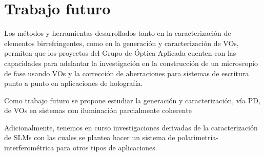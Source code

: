 
\section{Trabajo futuro}

Los métodos y herramientas desarrollados tanto en la caracterización
de elementos birrefringentes, como en la generación y caracterización
de VOs, permiten que los proyectos del Grupo de Óptica Aplicada cuenten
con las capacidades para adelantar la investigación en la construcción
de un microscopio de fase usando VOs y la corrección de aberraciones
para sistemas de escritura punto a punto en aplicaciones de
holografía. 

Como trabajo futuro se propone estudiar la generación y
caracterización, vía PD, de VOs en sistemas con iluminación parcialmente coherente

Adicionalmente, tenemos en curso investigaciones derivadas de la
caracterización de SLMs con las cuales se plantea hacer un sistema de
polarimetría-interferométrica para otros tipos de aplicaciones.



